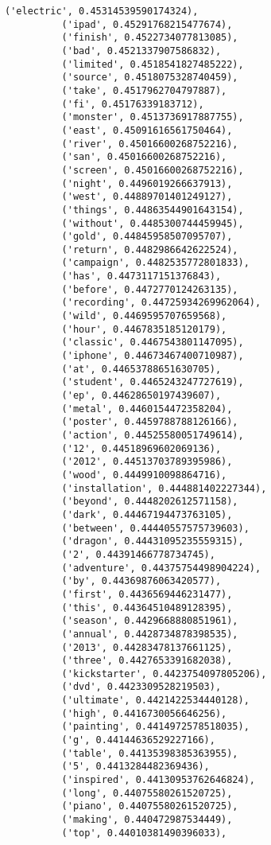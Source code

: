 \documentclass[11pt]{article}
\begin{document}
\begin{Verbatim}[commandchars=\\\{\}]
          ('electric', 0.45314539590174324),
          ('ipad', 0.45291768215477674),
          ('finish', 0.4522734077813085),
          ('bad', 0.4521337907586832),
          ('limited', 0.4518541827485222),
          ('source', 0.4518075328740459),
          ('take', 0.4517962704797887),
          ('fi', 0.45176339183712),
          ('monster', 0.4513736917887755),
          ('east', 0.45091616561750464),
          ('river', 0.45016600268752216),
          ('san', 0.45016600268752216),
          ('screen', 0.45016600268752216),
          ('night', 0.4496019266637913),
          ('west', 0.44889701401249127),
          ('things', 0.44863544901643154),
          ('without', 0.4485300744459945),
          ('gold', 0.44845958507095707),
          ('return', 0.4482986642622524),
          ('campaign', 0.4482535772801833),
          ('has', 0.4473117151376843),
          ('before', 0.4472770124263135),
          ('recording', 0.44725934269962064),
          ('wild', 0.4469595707659568),
          ('hour', 0.4467835185120179),
          ('classic', 0.4467543801147095),
          ('iphone', 0.44673467400710987),
          ('at', 0.44653788651630705),
          ('student', 0.4465243247727619),
          ('ep', 0.44628650197439607),
          ('metal', 0.4460154472358204),
          ('poster', 0.4459788788126166),
          ('action', 0.44525580051749614),
          ('12', 0.44518969602069136),
          ('2012', 0.44513703789395986),
          ('wood', 0.4449910098864716),
          ('installation', 0.444881402227344),
          ('beyond', 0.4448202612571158),
          ('dark', 0.44467194473763105),
          ('between', 0.44440557575739603),
          ('dragon', 0.44431095235559315),
          ('2', 0.44391466778734745),
          ('adventure', 0.44375754498904224),
          ('by', 0.44369876063420577),
          ('first', 0.4436569446231477),
          ('this', 0.44364510489128395),
          ('season', 0.4429668880851961),
          ('annual', 0.4428734878398535),
          ('2013', 0.44283478137661125),
          ('three', 0.4427653391682038),
          ('kickstarter', 0.4423754097805206),
          ('dvd', 0.4423309528219503),
          ('ultimate', 0.4421422534440128),
          ('high', 0.4416730056646256),
          ('painting', 0.4414972578518035),
          ('g', 0.44144636529227166),
          ('table', 0.44135398385363955),
          ('5', 0.4413284482369436),
          ('inspired', 0.44130953762646824),
          ('long', 0.44075580261520725),
          ('piano', 0.44075580261520725),
          ('making', 0.440472987534449),
          ('top', 0.44010381490396033),

\end{Verbatim}
\end{document}

